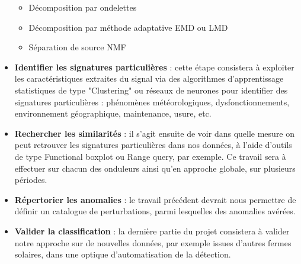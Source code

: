 \begin{itemize}
\begin{itemize}
\item Décomposition par ondelettes
\item Décomposition par méthode adaptative EMD ou LMD
\item Séparation de source NMF
\end{itemize}
\item \textbf{Identifier les signatures particulières} : cette étape consistera à exploiter les caractéristiques extraites du signal via des algorithmes d'apprentissage statistiques de type "Clustering" ou réseaux de neurones pour identifier des signatures particulières : phénomènes météorologiques, dysfonctionnements, environnement géographique, maintenance, usure, etc.
\item \textbf{Rechercher les similarités} : il s'agit ensuite de voir dans quelle mesure on peut retrouver les signatures particulières dans nos données, à l'aide d'outils de type Functional boxplot \cite{FboxPlot} ou Range query, par exemple. Ce travail sera à effectuer sur chacun des onduleurs ainsi qu'en approche globale, sur plusieurs périodes.
\item \textbf{Répertorier les anomalies} : le travail précédent devrait nous permettre de définir un catalogue de perturbations, parmi lesquelles des anomalies avérées.
\item \textbf{Valider la classification} : la dernière partie du projet consistera à valider notre approche sur de nouvelles données, par exemple issues d'autres fermes solaires, dans une optique d'automatisation de la détection.
\end{itemize}